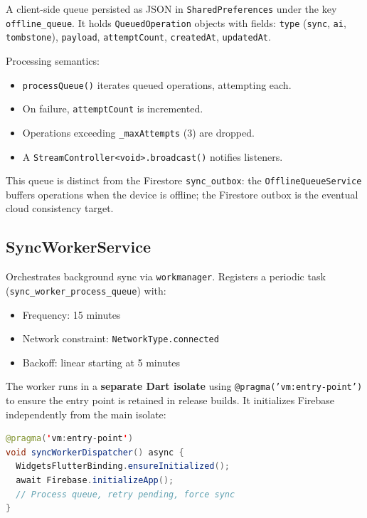\documentclass[12pt,a4paper,openany]{report}
\begin{document}
A client-side queue persisted as JSON in \texttt{SharedPreferences} under the key \texttt{offline\_queue}. It holds \texttt{QueuedOperation} objects with fields: \texttt{type} (\texttt{sync}, \texttt{ai}, \texttt{tombstone}), \texttt{payload}, \texttt{attemptCount}, \texttt{createdAt}, \texttt{updatedAt}.

Processing semantics:
\begin{itemize}[leftmargin=*]
  \item \texttt{processQueue()} iterates queued operations, attempting each.
  \item On failure, \texttt{attemptCount} is incremented.
  \item Operations exceeding \texttt{\_maxAttempts} (3) are dropped.
  \item A \texttt{StreamController<void>.broadcast()} notifies listeners.
\end{itemize}

This queue is distinct from the Firestore \texttt{sync\_outbox}: the \texttt{OfflineQueueService} buffers operations when the device is offline; the Firestore outbox is the eventual cloud consistency target.

\subsection{SyncWorkerService}

Orchestrates background sync via \texttt{workmanager}. Registers a periodic task (\texttt{sync\_worker\_process\_queue}) with:
\begin{itemize}[leftmargin=*]
  \item Frequency: 15 minutes
  \item Network constraint: \texttt{NetworkType.connected}
  \item Backoff: linear starting at 5 minutes
\end{itemize}

The worker runs in a \textbf{separate Dart isolate} using \texttt{@pragma('vm:entry-point')} to ensure the entry point is retained in release builds. It initializes Firebase independently from the main isolate:

\begin{lstlisting}[language=Java,caption={Background isolate entry point}]
@pragma('vm:entry-point')
void syncWorkerDispatcher() async {
  WidgetsFlutterBinding.ensureInitialized();
  await Firebase.initializeApp();
  // Process queue, retry pending, force sync
}
\end{lstlisting}
\end{document}
